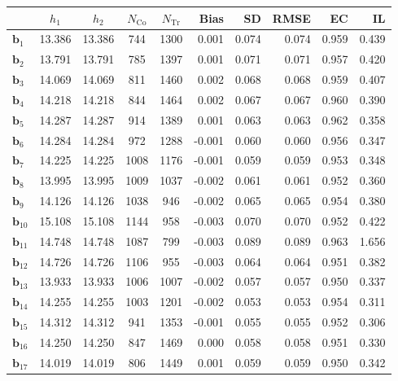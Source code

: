 \documentclass[10pt]{article}
\newcommand{\bb}{\mathbf{b}}
\begin{document}
\begin{table}[p]
    \caption{Fuzzy Effects (Simulations, $s=1$, Fuzzy Bandwidth Selector).}
    \label{tab:sa-simuls-fuzzy-s1-bwmain}
\end{table}

\begin{table}[p]
    \centering
\begin{tabular}{lccccrrrrr}
\toprule\toprule
 & $h_1$ & $h_2$ & $N_{\mathrm{Co}}$ & $N_{\mathrm{Tr}}$ & Bias & SD & RMSE & EC & IL \\
\midrule
$\bb_{1}$ & 13.386 & 13.386 & 744 & 1300 & 0.001 & 0.074 & 0.074 & 0.959 & 0.439 \\
$\bb_{2}$ & 13.791 & 13.791 & 785 & 1397 & 0.001 & 0.071 & 0.071 & 0.957 & 0.420 \\
$\bb_{3}$ & 14.069 & 14.069 & 811 & 1460 & 0.002 & 0.068 & 0.068 & 0.959 & 0.407 \\
$\bb_{4}$ & 14.218 & 14.218 & 844 & 1464 & 0.002 & 0.067 & 0.067 & 0.960 & 0.390 \\
$\bb_{5}$ & 14.287 & 14.287 & 914 & 1389 & 0.001 & 0.063 & 0.063 & 0.962 & 0.358 \\
$\bb_{6}$ & 14.284 & 14.284 & 972 & 1288 & -0.001 & 0.060 & 0.060 & 0.956 & 0.347 \\
$\bb_{7}$ & 14.225 & 14.225 & 1008 & 1176 & -0.001 & 0.059 & 0.059 & 0.953 & 0.348 \\
$\bb_{8}$ & 13.995 & 13.995 & 1009 & 1037 & -0.002 & 0.061 & 0.061 & 0.952 & 0.360 \\
$\bb_{9}$ & 14.126 & 14.126 & 1038 & 946 & -0.002 & 0.065 & 0.065 & 0.954 & 0.380 \\
$\bb_{10}$ & 15.108 & 15.108 & 1144 & 958 & -0.003 & 0.070 & 0.070 & 0.952 & 0.422 \\
$\bb_{11}$ & 14.748 & 14.748 & 1087 & 799 & -0.003 & 0.089 & 0.089 & 0.963 & 1.656 \\
$\bb_{12}$ & 14.726 & 14.726 & 1106 & 955 & -0.003 & 0.064 & 0.064 & 0.951 & 0.382 \\
$\bb_{13}$ & 13.933 & 13.933 & 1006 & 1007 & -0.002 & 0.057 & 0.057 & 0.950 & 0.337 \\
$\bb_{14}$ & 14.255 & 14.255 & 1003 & 1201 & -0.002 & 0.053 & 0.053 & 0.954 & 0.311 \\
$\bb_{15}$ & 14.312 & 14.312 & 941 & 1353 & -0.001 & 0.055 & 0.055 & 0.952 & 0.306 \\
$\bb_{16}$ & 14.250 & 14.250 & 847 & 1469 & 0.000 & 0.058 & 0.058 & 0.951 & 0.330 \\
$\bb_{17}$ & 14.019 & 14.019 & 806 & 1449 & 0.001 & 0.059 & 0.059 & 0.950 & 0.342 \\

\end{tabular}
\end{table}
\end{document}
